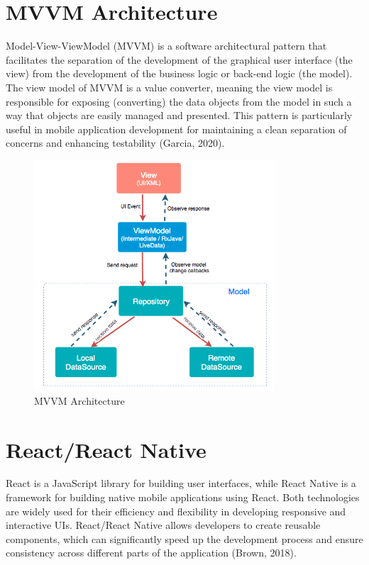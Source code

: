 \section{MVVM Architecture}
Model-View-ViewModel (MVVM) is a software architectural pattern that facilitates the separation of the development of the graphical user interface (the view) from the development of the business logic or back-end logic (the model). The view model of MVVM is a value converter, meaning the view model is responsible for exposing (converting) the data objects from the model in such a way that objects are easily managed and presented. This pattern is particularly useful in mobile application development for maintaining a clean separation of concerns and enhancing testability (Garcia, 2020).

\begin{figure}[H]
    \centering
    \includegraphics[width=0.8\textwidth]{Graphics/mvvm_architecture.png}
    \caption{MVVM Architecture}
    \label{fig:mvvm_architecture}
\end{figure}

\section{React/React Native}
React is a JavaScript library for building user interfaces, while React Native is a framework for building native mobile applications using React. Both technologies are widely used for their efficiency and flexibility in developing responsive and interactive UIs. React/React Native allows developers to create reusable components, which can significantly speed up the development process and ensure consistency across different parts of the application (Brown, 2018).

